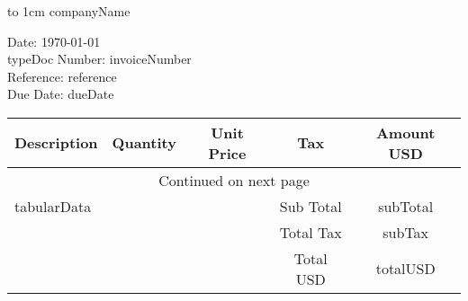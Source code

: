 \documentclass{article}   %
\begin{document}

\parbox[b][1cm][t]{0.35\textwidth}{\raggedright\ttfamily %
{\fontsize{14pt}{16pt}\selectfont %
\vbox to 1cm{\vss %
%
{{companyName}}%
%
}}
}
%
\hspace{4cm}
\parbox[b][2cm][t]{0.35\textwidth}{
\vskip 0.5cm

Date: \today \\
{{typeDoc}} Number: {{invoiceNumber}}\\
Reference: {{reference}} \\
Due Date: {{dueDate}}
}%

\vskip 4cm %

\begin{center} %
    
 \begin{longtable}{||p{\dimexpr 6cm-\tabcolsep} c c c c ||} %
 \hline     %
 \multicolumn{1}{||c}{Description} & \multicolumn{1}{c}{Quantity} & \multicolumn{1}{c}{Unit Price} & \multicolumn{1}{c}{Tax} & \multicolumn{1}{c||}{Amount USD} \\ [0.9ex] %
 \hline\hline 
 \endfirsthead  %
 \hline
 \multicolumn{5}{|c|}{{Continued on next page}} \\  %
 \hline
 \endfoot %
 \hline\hline
 \endlastfoot %

 {{tabularData}} 
 \hline
   &    &     & Sub Total   & {{subTotal}}\\
 \hline
   &    &     & Total Tax   & {{subTax}}\\
\hline
   &    &     & Total USD    & {{totalUSD}}\\

\hline\hline 
\end{longtable} %
\end{center}    %

\vspace{1cm}
\end{document}
